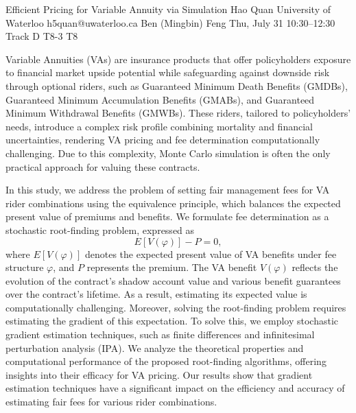 \begin{talk}
  {Efficient Pricing for Variable Annuity via Simulation}%
  {Hao Quan}%
  {University of Waterloo}%
  {h5quan@uwaterloo.ca}%
  {Ben (Mingbin) Feng}%
  {}%
  {Thu, July 31 10:30–12:30 Track D}%
  {T8-3}%
  {T8}%
  
				

Variable Annuities (VAs) are insurance products that offer policyholders exposure to financial market upside potential while safeguarding against downside risk through optional riders, such as Guaranteed Minimum Death Benefits (GMDBs), Guaranteed Minimum Accumulation Benefits (GMABs), and Guaranteed Minimum Withdrawal Benefits (GMWBs). These riders, tailored to policyholders’ needs, introduce a complex risk profile combining mortality and financial uncertainties, rendering VA pricing and fee determination computationally challenging. Due to this complexity, Monte Carlo simulation is often the only practical approach for valuing these contracts.

In this study, we address the problem of setting fair management fees for VA rider combinations using the equivalence principle, which balances the expected present value of premiums and benefits. We formulate fee determination as a stochastic root-finding problem, expressed as
\[
E[V(\varphi)] - P = 0,
\]
where \( E[V(\varphi)] \) denotes the expected present value of VA benefits under fee structure \( \varphi \), and \( P \) represents the premium. The VA benefit \( V(\varphi) \) reflects the evolution of the contract’s shadow account value and various benefit guarantees over the contract’s lifetime. As a result, estimating its expected value is computationally challenging. Moreover, solving the root-finding problem requires estimating the gradient of this expectation. To solve this, we employ stochastic gradient estimation techniques, such as finite differences and infinitesimal perturbation analysis (IPA). We analyze the theoretical properties and computational performance of the proposed root-finding algorithms, offering insights into their efficacy for VA pricing. Our results show that gradient estimation techniques have a significant impact on the efficiency and accuracy of estimating fair fees for various rider combinations.
\end{talk}

